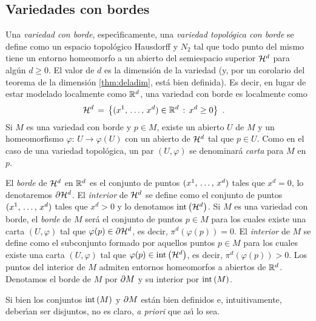\theoremstyle{plain}
\newtheorem{teoInvarianzaDeLasEsquinas}{Teorema}[section]

\theoremstyle{remark}
\newtheorem{obsElBordeConEsquinasNoEsVariedad}{Observaci\'{o}n}[section]


\subsection{Variedades con bordes}
Una \emph{variedad con borde}, espec\'{\i}ficamente, una \emph{variedad %
topol\'{o}gica con borde} se define como un espacio topol\'{o}gico
Hausdorff y $N_{2}$ tal que todo punto del mismo tiene un entorno homeomorfo
a un abierto del semiespacio superior $\hemi[d]$ para alg\'{u}n $d\geq 0$.
El valor de $d$ es la dimensi\'{o}n de la variedad (y, por un corolario del
teorema de la dimensi\'{o}n \ref{thm:deladim}, est\'{a} bien definida).
Es decir, en lugar de estar modelado localmente como $\bb{R}^{d}$, una
variedad con borde es localmente como
\begin{align*}
	\hemi[d] & \,=\,\left\lbrace (\lista*{x}{d})\in\bb{R}^{d}\,:\,
				x^{d}\geq 0\right\rbrace
	\text{ .}
\end{align*}
%
Si $M$ es una variedad con borde y $p\in M$, existe un abierto $U$ de $M$
y un homeomorfismo $\varphi:\,U\rightarrow\varphi(U)$ con un abierto de
$\hemi[d]$ tal que $p\in U$. Como en el caso de una variedad topol\'{o}gica,
un par $(U,\varphi)$ se denominar\'{a} \emph{carta} para $M$ en $p$.

El \emph{borde} de $\hemi[d]$ en $\bb{R}^{d}$ es el conjunto de puntos
$(\lista*{x}{d})$ tales que $x^{d}=0$, lo denotaremos $\borde[{\hemi[d]}]$.
El \emph{interior} de $\hemi[d]$ se define como el conjunto de puntos
$(\lista*{x}{d})$ tales que $x^{d}>0$ y lo denotamos $\interior{\hemi[d]}$.
Si $M$ es una variedad con borde, el \emph{borde} de $M$ ser\'{a} el
conjunto de puntos $p\in M$ para los cuales existe una carta $(U,\varphi)$
tal que $\varphi(p)\in\borde[{\hemi[d]}]$, es decir, $\pi^{d}(\varphi(p))=0$.
El \emph{interior} de $M$ se define como el subconjunto formado por aquellos
puntos $p\in M$ para los cuales existe una carta $(U,\varphi)$ tal que
$\varphi(p)\in\interior{\hemi[d]}$, es decir, $\pi^{d}(\varphi(p))>0$.
Los puntos del interior de $M$ admiten entornos homeomorfos a abiertos de
$\bb{R}^{d}$. Denotamos el borde de $M$ por $\borde[M]$ y su interior por
$\interior{M}$.

Si bien los conjuntos $\interior{M}$ y $\borde[M]$ est\'{a}n bien definidos
e, intuitivamente, deber\'{\i}an ser disjuntos, no es claro, \textit{a %
priori} que as\'{\i} lo sea.

